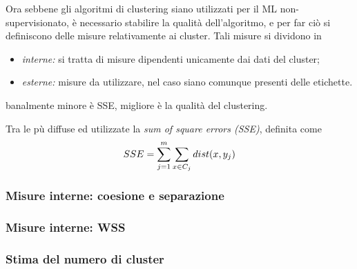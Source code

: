 \documentclass{subfiles}
\begin{document}
Ora sebbene gli algoritmi di clustering siano utilizzati per il ML non-supervisionato, è necessario stabilire la qualità dell'algoritmo,
e per far ciò si definiscono delle misure relativamente ai cluster. Tali misure si dividono in
\begin{itemize}
    \item \emph{interne:} si tratta di misure dipendenti unicamente dai dati del cluster;
    \item \emph{esterne:} misure da utilizzare, nel caso siano comunque presenti delle etichette.
\end{itemize}
\begin{MarginNote}
    banalmente minore è SSE, migliore è la qualità del clustering.
\end{MarginNote}
Tra le pù diffuse ed utilizzate la \emph{sum of square errors (SSE)}, definita come
$$
    SSE = \Sum{\Sum{dist(x, y_{j})}{x \in C_{j}}}{j = 1}[m]
$$

\subsubsection{Misure interne: coesione e separazione}


\subsubsection{Misure interne: WSS}


\subsubsection{Stima del numero di cluster}

\end{document}
